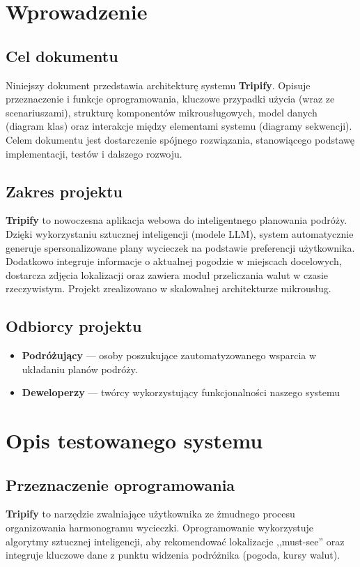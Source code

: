 \documentclass[11pt,a4paper]{article}
\newcommand{\sysname}{\textbf{Tripify}}
\begin{document}
\section{Wprowadzenie}
\subsection{Cel dokumentu}
Niniejszy dokument przedstawia architekturę systemu \sysname{}. Opisuje przeznaczenie i funkcje oprogramowania, kluczowe przypadki użycia (wraz ze scenariuszami), strukturę komponentów mikrousługowych, model danych (diagram klas) oraz interakcje między elementami systemu (diagramy sekwencji). Celem dokumentu jest dostarczenie spójnego rozwiązania, stanowiącego podstawę implementacji, testów i dalszego rozwoju.

\subsection{Zakres projektu}
\sysname{} to nowoczesna aplikacja webowa do inteligentnego planowania podróży. Dzięki wykorzystaniu sztucznej inteligencji (modele LLM), system automatycznie generuje spersonalizowane plany wycieczek na podstawie preferencji użytkownika. Dodatkowo integruje informacje o aktualnej pogodzie w miejscach docelowych, dostarcza zdjęcia lokalizacji oraz zawiera moduł przeliczania walut w czasie rzeczywistym. Projekt zrealizowano w skalowalnej architekturze mikrousług.

\subsection{Odbiorcy projektu}
\begin{itemize}
  \item \textbf{Podróżujący} — osoby poszukujące zautomatyzowanego wsparcia w układaniu planów podróży.
  \item \textbf{Deweloperzy} — twórcy wykorzystujący funkcjonalności naszego systemu
\end{itemize}

\section{Opis testowanego systemu}
\subsection{Przeznaczenie oprogramowania}
\sysname{} to narzędzie zwalniające użytkownika ze żmudnego procesu organizowania harmonogramu wycieczki. Oprogramowanie wykorzystuje algorytmy sztucznej inteligencji, aby rekomendować lokalizacje ,,must-see'' oraz integruje kluczowe dane z punktu widzenia podróżnika (pogoda, kursy walut).
\end{document}
